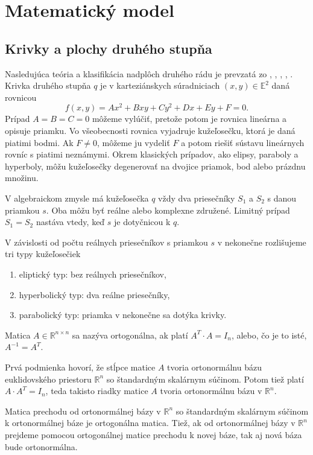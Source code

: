 \chapter{Matematický model}
\label{kap:matematicky_model}
\section{Krivky a plochy druhého stupňa}
Nasledujúca teória a klasifikácia nadplôch druhého rádu je prevzatá zo \cite{Ivan}, \cite{Kor13}, \cite{Gla16}, \cite{Ode20}, \cite{Zla11}.
Krivka druhého stupňa $q$ je v karteziánskych súradniciach $(x, y) \in \mathbb{E}^2$ daná rovnicou 
$$ f(x, y) = Ax^2 + Bxy + Cy^2 + Dx + Ey + F = 0.$$
Prípad $A = B = C = 0$  môžeme vylúčiť, pretože potom je rovnica lineárna a opisuje priamku. Vo všeobecnosti rovnica vyjadruje kužeľosečku, ktorá je daná piatimi bodmi. Ak $F \neq 0$, môžeme ju vydeliť $F$ a potom riešiť sústavu lineárnych rovníc s piatimi neznámymi. Okrem klasických prípadov, ako elipsy, paraboly a hyperboly, môžu kužeľosečky degenerovať na dvojice priamok, bod alebo prázdnu množinu.

V algebraickom zmysle má kužeľosečka $q$ vždy dva priesečníky $S_1$ a $S_2$ s danou priamkou $s$. Oba môžu byť reálne alebo komplexne združené. Limitný prípad $S_1 = S_2$ nastáva vtedy, keď $s$ je dotyčnicou k $q$.

V závislosti od počtu reálnych priesečníkov s priamkou $s$ v nekonečne rozlišujeme tri typy kužeľosečiek 
\begin{enumerate}
\item eliptický typ: bez reálnych priesečníkov,
\item hyperbolický typ: dva reálne priesečníky,
\item parabolický typ: priamka v nekonečne sa dotýka krivky.
\end{enumerate}

\begin{definition}
Matica $A \in \mathbb{R}^{n \times n}$ sa nazýva ortogonálna, ak platí $A^T \cdot A = I_n$, alebo, čo je to isté, $A^{-1} = A^T$. 
\end{definition}
Prvá podmienka hovorí, že stĺpce matice $A$ tvoria ortonormálnu bázu euklidovského priestoru $\mathbb{R}^n$ so štandardným skalárnym súčinom. Potom tiež platí $A \cdot A^T = I_n$, teda takisto riadky matice $A$ tvoria ortonormálnu bázu v $\mathbb{R}^n$. 

\begin{theorem} 
Matica prechodu od ortonormálnej bázy v $\mathbb{R}^n$ so štandardným skalárnym súčinom k ortonormálnej báze je ortogonálna matica. Tiež, ak od ortonormálnej bázy v $\mathbb{R}^n$ prejdeme pomocou ortogonálnej matice prechodu k novej báze,
tak aj nová báza bude ortonormálna.
\end{theorem}

